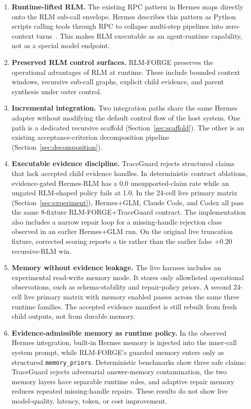\documentclass[11pt,a4paper]{article}
\begin{document}
\begin{enumerate}[leftmargin=*]
\item \textbf{Runtime-lifted RLM.} The existing RPC pattern in Hermes maps
directly onto the RLM sub-call envelope. Hermes describes this pattern as
Python scripts calling tools through RPC to collapse multi-step pipelines into
zero-context turns~\citep{nous2025hermes}. This makes RLM executable as an
agent-runtime capability, not as a special model endpoint.

\item \textbf{Preserved RLM control surfaces.} RLM-FORGE preserves the
operational advantages of RLM at runtime. These include bounded context
windows, recursive sub-call graphs, explicit child evidence, and parent
synthesis under outer control.

\item \textbf{Incremental integration.} Two integration paths share the same
Hermes adapter without modifying the default control flow of the host system.
One path is a dedicated recursive scaffold (Section~\ref{sec:scaffold}).
The other is an existing acceptance-criterion decomposition pipeline
(Section~\ref{sec:decomposition}).

\item \textbf{Executable evidence discipline.} TraceGuard rejects structured
claims that lack accepted child evidence handles. In deterministic contract
ablations, evidence-gated Hermes-RLM has a 0.0 unsupported-claim rate while
an ungated RLM-shaped policy fails at 1.0. In the 24-cell live primary matrix
(Section~\ref{sec:experiment}), Hermes+GLM, Claude Code, and Codex all pass
the same 8-fixture RLM-FORGE+TraceGuard contract. The implementation also
includes a narrow repair loop for a missing-handle rejection class observed in
an earlier Hermes+GLM run. On the
original live truncation fixture, corrected scoring reports a tie rather than
the earlier false $+0.20$ recursive-RLM win.

\item \textbf{Memory without evidence leakage.} The live harness includes an
experimental read-write memory mode. It stores only allowlisted operational
observations, such as schema-stability and repair-policy priors. A second
24-cell live primary matrix with memory enabled passes across the same three
runtime families. The accepted evidence manifest is still rebuilt from fresh
child outputs, not from durable memory.

\item \textbf{Evidence-admissible memory as runtime policy.} In the observed
Hermes integration, built-in Hermes memory is injected into the inner-call
system prompt, while RLM-FORGE's guarded memory enters only as structured
\texttt{memory\_priors}. Deterministic benchmarks show three safe claims:
TraceGuard rejects adversarial answer-memory contamination, the two memory
layers have separable runtime roles, and adaptive repair memory reduces
repeated missing-handle repairs. These results do not show live model-quality,
latency, token, or cost improvement.


\end{enumerate}
\end{document}
